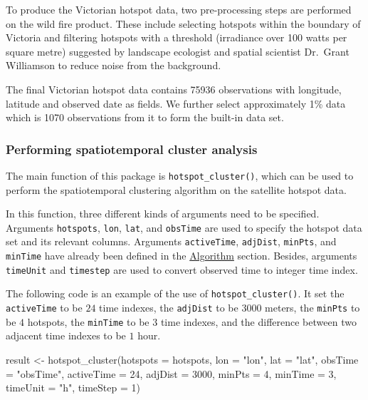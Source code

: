 To produce the Victorian hotspot data, two pre-processing steps are
performed on the wild fire product. These include selecting hotspots
within the boundary of Victoria and filtering hotspots with a threshold
(irradiance over 100 watts per square metre) suggested by landscape
ecologist and spatial scientist Dr.~Grant Williamson
\citeyearpar{hotspots} to reduce noise from the background.

The final Victorian hotspot data contains 75936 observations with
longitude, latitude and observed date as fields. We further select
approximately 1\% data which is 1070 observations from it to form the
built-in data set.

\hypertarget{performing-spatiotemporal-cluster-analysis}{%
\subsubsection{Performing spatiotemporal cluster
analysis}\label{performing-spatiotemporal-cluster-analysis}}

The main function of this package is \texttt{hotspot\_cluster()}, which
can be used to perform the spatiotemporal clustering algorithm on the
satellite hotspot data.

In this function, three different kinds of arguments need to be
specified. Arguments \texttt{hotspots}, \texttt{lon}, \texttt{lat}, and
\texttt{obsTime} are used to specify the hotspot data set and its
relevant columns. Arguments \texttt{activeTime}, \texttt{adjDist},
\texttt{minPts}, and \texttt{minTime} have already been defined in the
\protect\hyperlink{algorithm}{Algorithm} section. Besides, arguments
\texttt{timeUnit} and \texttt{timestep} are used to convert observed
time to integer time index.

The following code is an example of the use of
\texttt{hotspot\_cluster()}. It set the \texttt{activeTime} to be \(24\)
time indexes, the \texttt{adjDist} to be \(3000\) meters, the
\texttt{minPts} to be \(4\) hotspots, the \texttt{minTime} to be \(3\)
time indexes, and the difference between two adjacent time indexes to be
\(1\) hour.

\begin{Schunk}
\begin{Sinput}
result <- hotspot_cluster(hotspots = hotspots,
                          lon = "lon",
                          lat = "lat",
                          obsTime = "obsTime",
                          activeTime = 24,
                          adjDist = 3000,
                          minPts = 4,
                          minTime = 3,
                          timeUnit = "h",
                          timeStep = 1)
\end{Sinput}
\end{Schunk}

